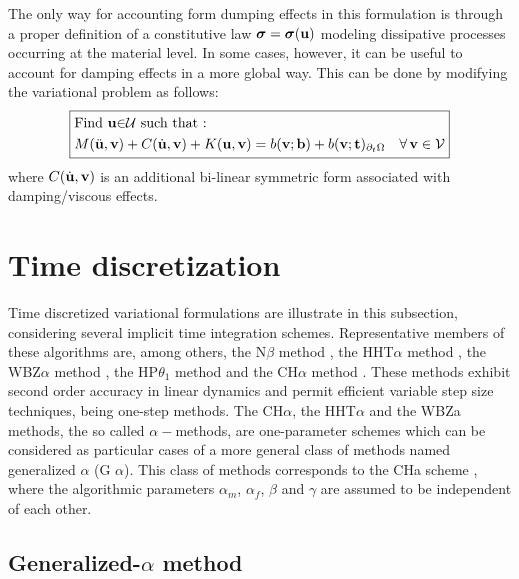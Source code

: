 The only way for accounting form dumping effects in this formulation
is through a proper definition of a constitutive law $\mbox{\boldmath${\sigma}$}=\mbox{\boldmath${\sigma}$}({\bf{u}})$
modeling dissipative processes occurring at the material level. In
some cases, however, it can be useful to account for damping effects
in a more global way. This can be done by modifying the variational
problem as follows:
\begin{equation}
\boxed{\begin{aligned} & \text{Find \ensuremath{{\bf{u}}}\ensuremath{\in}\ensuremath{\mathcal{U}} such that : }\\
 & M(\ddot{{\bf{u}}},{\bf{v}})+C(\dot{{\bf{u}}},{\bf{v}})+K({\bf{u}},{\bf{v}})=b({\bf{v}};{\bf{b}})+b({\bf{v}};{\bf t})_{\partial_{t}\Omega}\quad\forall\,{\bf{v}}\in\mathcal{V}
\end{aligned}
}
\end{equation}
where $C(\dot{{\bf{u}}},{\bf{v}})$ is an additional bi-linear symmetric form
associated with damping/viscous effects.

\section{Time discretization}

Time discretized variational formulations are illustrate in this subsection,
considering several implicit time integration schemes. Representative
members of these algorithms are, among others, the N\textminus $\beta$
method \cite{newmark1959method}, the HHT\textminus $\alpha$ method \cite{hilber1977improved}, the WBZ\textminus $\alpha$ method \cite{wood1980alpha}, the HP\textminus $\theta_{1}$ method \cite{hoff1988development} and the CH\textminus $\alpha$ method \cite{chung1993time}. These methods exhibit second order accuracy
in linear dynamics and permit efficient variable step size techniques,
being one-step methods. The CH\textminus $\alpha$, the HHT\textminus $\alpha$
and the WBZ\textminus \textgreek{a} methods, the so called $\alpha-$methods,
are one-parameter schemes which can be considered as particular cases
of a more general class of methods named generalized \textminus{}
$\alpha$ (G \textminus{} $\alpha$). This class
of methods corresponds to the CH\textminus \textgreek{a} scheme \cite{chung1993time}, where the algorithmic parameters $\alpha_{m}$,
$\alpha_{f}$, $\beta$ and $\gamma$ are assumed to be independent
of each other.

\subsection{Generalized-\texorpdfstring{$\alpha$}{a} method}

